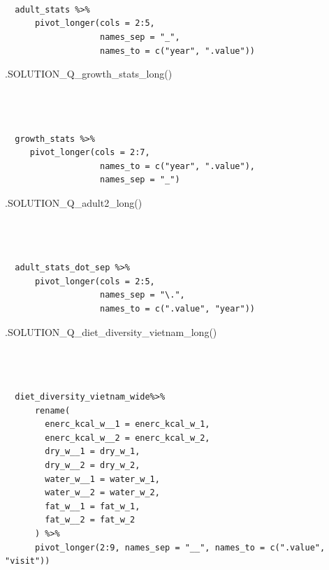 \documentclass[
  letterpaper,
  DIV=11,
  numbers=noendperiod]{scrreprt}
\newenvironment{Shaded}{\begin{snugshade}}{\end{snugshade}}
\newcommand{\FunctionTok}[1]{\textcolor[rgb]{0.28,0.35,0.67}{#1}}
\newcommand{\NormalTok}[1]{\textcolor[rgb]{0.00,0.23,0.31}{#1}}
\begin{document}
\begin{verbatim}


  
  adult_stats %>%
      pivot_longer(cols = 2:5,
                   names_sep = "_",
                   names_to = c("year", ".value"))
\end{verbatim}

\begin{Shaded}
\begin{Highlighting}[]
\FunctionTok{.SOLUTION\_Q\_growth\_stats\_long}\NormalTok{()}
\end{Highlighting}
\end{Shaded}

\begin{verbatim}


  
  growth_stats %>%
     pivot_longer(cols = 2:7,
                   names_to = c("year", ".value"),
                   names_sep = "_")
\end{verbatim}

\begin{Shaded}
\begin{Highlighting}[]
\FunctionTok{.SOLUTION\_Q\_adult2\_long}\NormalTok{()}
\end{Highlighting}
\end{Shaded}

\begin{verbatim}


  
  adult_stats_dot_sep %>%
      pivot_longer(cols = 2:5,
                   names_sep = "\.",
                   names_to = c(".value", "year"))
\end{verbatim}

\begin{Shaded}
\begin{Highlighting}[]
\FunctionTok{.SOLUTION\_Q\_diet\_diversity\_vietnam\_long}\NormalTok{()}
\end{Highlighting}
\end{Shaded}

\begin{verbatim}


  
  diet_diversity_vietnam_wide%>%
      rename(
        enerc_kcal_w__1 = enerc_kcal_w_1,
        enerc_kcal_w__2 = enerc_kcal_w_2,
        dry_w__1 = dry_w_1,
        dry_w__2 = dry_w_2,
        water_w__1 = water_w_1,
        water_w__2 = water_w_2,
        fat_w__1 = fat_w_1,
        fat_w__2 = fat_w_2
      ) %>%  
      pivot_longer(2:9, names_sep = "__", names_to = c(".value", "visit"))
  
\end{verbatim}
\end{document}
